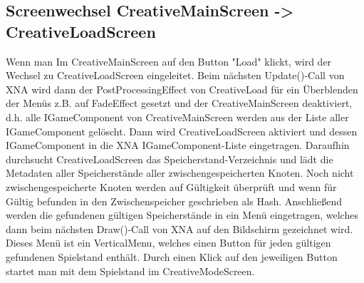 \subsection{Screenwechsel CreativeMainScreen -> CreativeLoadScreen}
\newline
\newline
Wenn man Im CreativeMainScreen auf den Button "Load" klickt, wird der Wechsel zu CreativeLoadScreen eingeleitet.
Beim nächsten Update()-Call von XNA wird dann der PostProcessingEffect von CreativeLoad für ein Überblenden der Menüs z.B. auf FadeEffect gesetzt und der CreativeMainScreen deaktiviert, d.h. alle IGameComponent von CreativeMainScreen 
werden aus der Liste aller IGameComponent gelöscht. Dann wird CreativeLoadScreen aktiviert und dessen IGameComponent in die XNA IGameComponent-Liste eingetragen.
\newline
Daraufhin durchsucht CreativeLoadScreen das Speicherstand-Verzeichnis und lädt die Metadaten aller Speicherstände aller zwischengespeicherten Knoten. 
\newline
Noch nicht zwischengespeicherte Knoten werden auf Gültigkeit überprüft und wenn für Gültig befunden in den Zwischenspeicher geschrieben als Hash.
\newline
Anschließend werden die gefundenen gültigen Speicherstände in ein Menü eingetragen, welches dann beim nächsten Draw()-Call von XNA auf den Bildschirm gezeichnet wird.
\newline
Dieses Menü ist ein VerticalMenu, welches einen Button für jeden gültigen gefundenen Spielstand enthält. Durch einen Klick auf den jeweiligen Button 
startet man mit dem Spielstand im CreativeModeScreen.
